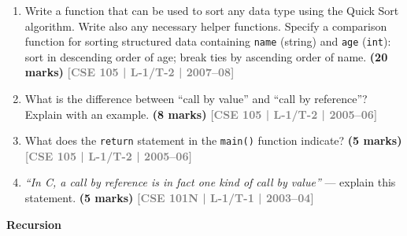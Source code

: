 \documentclass[12pt,a3paper]{article}
\newcommand{\yr}[1]{\hfill\textcolor{gray}{\small\textbf{[#1]}}}
\newcommand{\mk}[1]{\textcolor{orange!70!black}{\small\textbf{(#1 marks)}}}
\newcommand{\subtopic}[2]{%
  \vspace{10pt}
  \noindent\begin{tcolorbox}[colback=#1!8,colframe=#1,boxrule=0.6pt,arc=4pt,
    left=6pt,right=6pt,top=4pt,bottom=4pt]
    \small\bfseries\textcolor{#1}{#2}
  \end{tcolorbox}
  \vspace{2pt}
}
\begin{document}
\begin{enumerate}
\item Write a function that can be used to sort any data type using the Quick Sort algorithm. Write also any necessary helper functions. Specify a comparison function for sorting structured data containing \texttt{name} (string) and \texttt{age} (\texttt{int}): sort in descending order of age; break ties by ascending order of name.
\mk{20} \yr{CSE 105 | L-1/T-2 | 2007--08}

\item What is the difference between ``call by value'' and ``call by reference''? Explain with an example.
\mk{8} \yr{CSE 105 | L-1/T-2 | 2005--06}

\item What does the \texttt{return} statement in the \texttt{main()} function indicate?
\mk{5} \yr{CSE 105 | L-1/T-2 | 2005--06}

\item \textit{``In C, a call by reference is in fact one kind of call by value''} --- explain this statement.
\mk{5} \yr{CSE 101N | L-1/T-1 | 2003--04}

\end{enumerate}

\subtopic{cB}{Recursion}
\label{sub:s3-recursion}
\end{document}
